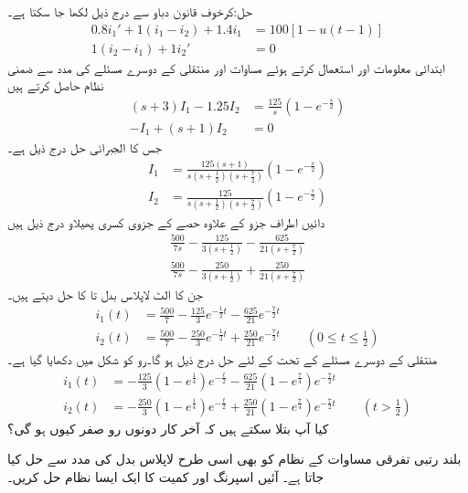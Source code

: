 حل:کرخوف قانون دباو سے درج ذیل لکھا جا سکتا ہے۔
\begin{align*}
0.8i_1'+1(i_1-i_2)+1.4i_1&=100[1-u(t-1)]\\
1(i_2-i_1)+1i_2'&=0
\end{align*}
ابتدائی معلومات  اور  استعمال کرتے ہوئے مساوات  اور منتقلی کے دوسرے مسئلے کی مدد سے ضمنی نظام حاصل کرتے ہیں
\begin{align*}
(s+3)I_1-1.25I_2&=\frac{125}{s}(1-e^{-\frac{s}{2}})\\
-I_1+(s+1)I_2&=0
\end{align*}
جس کا الجبرائی حل درج ذیل ہے۔
\begin{align*}
I_1&=\frac{125(s+1)}{s(s+\frac{1}{2})(s+\frac{7}{2})}(1-e^{-\frac{s}{2}})\\
I_2&=\frac{125}{s(s+\frac{1}{2})(s+\frac{7}{2})}(1-e^{-\frac{s}{2}})
\end{align*}
دائیں اطراف جزو  کے علاوہ حصے کے جزوی کسری پھیلاو درج ذیل ہیں
\begin{align*}
\frac{500}{7s}-\frac{125}{3(s+\frac{1}{2})}-\frac{625}{21(s+\frac{7}{2})}\\
\frac{500}{7s}-\frac{250}{3(s+\frac{1}{2})}+\frac{250}{21(s+\frac{7}{2})}
\end{align*}
جن کا الٹ لاپلاس بدل  تا  کا حل دیتے ہیں۔ 
\begin{align*}
i_1(t)&=\frac{500}{7}-\frac{125}{3}e^{-\frac{1}{2}t}-\frac{625}{21}e^{-\frac{7}{2}t}\\
i_2(t)&=\frac{500}{7}-\frac{250}{3}e^{-\frac{1}{2}t}+\frac{250}{21}e^{-\frac{7}{2}t}\quad \quad (0\le t \le \frac{1}{2})
\end{align*}
منتقلی کے دوسرے مسئلے کے تحت  کے لئے حل  درج ذیل ہو گا۔رو کو شکل  میں دکھایا گیا ہے۔
\begin{align*}
i_1(t)&=-\frac{125}{3}(1-e^{\frac{1}{4}})e^{-\frac{t}{2}}-\frac{625}{21}(1-e^{\frac{7}{4}})e^{-\frac{7}{2}t}\\
i_2(t)&=-\frac{250}{3}(1-e^{\frac{1}{4}})e^{-\frac{t}{2}}+\frac{250}{21}(1-e^{\frac{7}{4}})e^{-\frac{7}{2}t}\quad \quad (t>\frac{1}{2}) 
\end{align*}
کیا آپ بتلا سکتے ہیں کہ آخر کار دونوں رو صفر کیوں ہو گی؟ 

بلند رتبی تفرقی مساوات کے نظام کو بھی اسی طرح لاپلاس بدل کی مدد سے حل کیا جاتا ہے۔ آئیں اسپرنگ اور کمیت کا ایک ایسا نظام حل کریں۔

